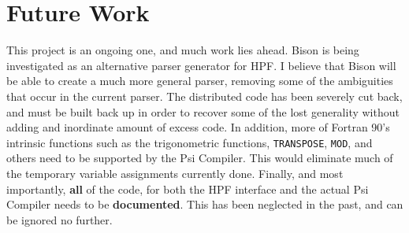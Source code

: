 \section{Future Work}
This project is an ongoing one, and much work lies ahead.  Bison is
being investigated as an alternative parser generator for HPF.  I
believe that Bison will be able to create a much more general parser,
removing some of the ambiguities that occur in the current parser.  
The distributed code has been severely cut back, and must be built
back up in order to recover some of the lost generality without adding
and inordinate amount of excess code.  In addition, more of Fortran 90's
intrinsic functions such as the trigonometric functions, {\tt TRANSPOSE},
{\tt MOD}, and others need to be supported by the Psi Compiler.  This
would eliminate much of the temporary variable assignments currently
done.  Finally, and most importantly, {\bf all} of the code, for both the
HPF interface and the actual Psi Compiler needs to be {\bf documented}.
This has been neglected in the past, and can be ignored no further.

